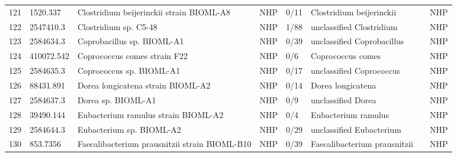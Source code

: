 \begin{longtable}{llllllll}
121 &      1520.337 &                                 Clostridium beijerinckii strain BIOML-A8 &   NHP &      0/11 &                       Clostridium beijerinckii &                \cite{poyet2019library,shi2008transcriptional} &   NHP \\
122 &     2547410.3 &                                                    Clostridium sp. C5-48 &   NHP &      1/88 &                       unclassified Clostridium &                                              \cite{2547410.3} &   NHP \\
123 &     2584634.3 &                                               Coprobacillus sp. BIOML-A1 &   NHP &      0/39 &                     unclassified Coprobacillus &                             \cite{poyet2019library,2584634.3} &   NHP \\
124 &    410072.542 &                                             Coprococcus comes strain F22 &   NHP &       0/6 &                              Coprococcus comes &                                             \cite{410072.542} &   NHP \\
125 &     2584635.3 &                                                 Coprococcus sp. BIOML-A1 &   NHP &      0/17 &                       unclassified Coprococcus &                             \cite{poyet2019library,2584635.3} &   NHP \\
126 &     88431.891 &                                        Dorea longicatena strain BIOML-A2 &   NHP &      0/14 &                              Dorea longicatena &             \cite{poyet2019library,taras2002reclassification} &   NHP \\
127 &     2584637.3 &                                                       Dorea sp. BIOML-A1 &   NHP &       0/9 &                             unclassified Dorea &                             \cite{poyet2019library,2584637.3} &   NHP \\
128 &     39490.144 &                                      Eubacterium ramulus strain BIOML-A2 &   NHP &       0/4 &                            Eubacterium ramulus &              \cite{poyet2019library,rodriguez2019bacteroides} &   NHP \\
129 &     2584644.3 &                                                 Eubacterium sp. BIOML-A2 &   NHP &      0/29 &                       unclassified Eubacterium &           \cite{poyet2019library,schwiertz2000quantification} &   NHP \\
130 &      853.7356 &                            Faecalibacterium prausnitzii strain BIOML-B10 &   NHP &      0/39 &                   Faecalibacterium prausnitzii &             \cite{poyet2019library,lopez2017faecalibacterium} &   NHP \\

\end{longtable}

